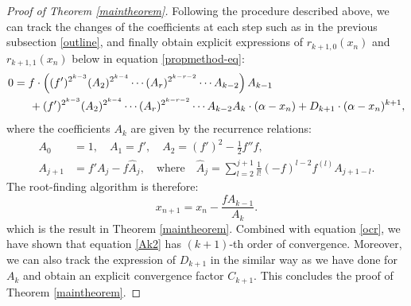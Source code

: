 \documentclass{article}
\begin{document}
\begin{proof}[Proof of Theorem \ref{maintheorem}]
Following the procedure described above, we can track the changes of the coefficients at each step such as in the previous subsection \ref{outline}, and finally obtain explicit expressions of $r_{k+1,0}(x_{n})$ and $r_{k+1,1}(x_{n})$ below in equation \eqref{propmethod-eq}:
\begin{equation} \label{propmethod-eq}
   \begin{aligned} 
    0 &= f\cdot\left( (f')^{2^{k-3}}(A_{2})^{2^{k-4}}\cdots (A_{r})^{2^{k-r-2}}\cdots A_{k-2} \right)A_{k-1}\\
    &\hspace{0.5cm} +(f')^{2^{k-3}}(A_{2})^{2^{k-4}}\cdots (A_{r})^{2^{k-r-2}}\cdots A_{k-2}A_{k}\cdot (\alpha-x_{n}) + D_{k+1}\cdot(\alpha-x_{n}) ^{k+1},
  \end{aligned}
\end{equation}
where the coefficients $A_{k}$ are given by the recurrence relations:
\begin{equation}\label{Ak}
\begin{aligned}
  A_{0} &= 1,\quad A_{1}=f',\quad A_{2}=(f')^{2}-\frac{1}{2}f''f,\\
  A_{j+1} &= f'A_{j}-f\widehat{A}_{j},\quad \text{where}\quad  \widehat{A}_{j} = \sum_{l=2}^{j+1}\frac{1}{l!}(-f)^{l-2}f^{(l)}A_{j+1-l}.
\end{aligned}
\end{equation} 
The root-finding algorithm is therefore:
\begin{equation}\label{Ak2}
  x_{n+1}=x_{n}-\frac{fA_{k-1}}{A_{k}}.
\end{equation}
which is the result in Theorem \ref{maintheorem}. Combined with equation \eqref{ocr}, we have shown that equation \eqref{Ak2} has $(k+1)$-th order of convergence. Moreover, we can also track the expression of $D_{k+1}$ in the similar way as we have done for $A_{k}$ and obtain an explicit convergence factor $C_{k+1}$. This concludes the proof of Theorem \ref{maintheorem}. 
\end{proof}

\end{document}

